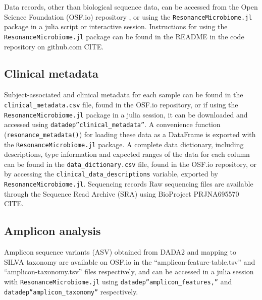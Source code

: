 \documentclass[fleqn,10pt]{wlscirep}
\begin{document}

Data records, other than biological sequence data, can be accessed from the Open Science Foundation (OSF.io) repository \cite{Bonham2021-zy},
or using the \verb|ResonanceMicrobiome.jl| package in a julia script or interactive session.
Instructions for using the \verb|ResonanceMicrobiome.jl| package can be found in the README in the code repository on github.com {{CITE}}.

\subsection*{Clinical metadata}

Subject-associated and clinical metadata for each sample can be found in the \verb|clinical_metadata.csv| file,
found in the OSF.io repository, or if using the \verb|ResonanceMicrobiome.jl| package in a julia session,
it can be downloaded and accessed using \verb|datadep”clinical_metadata”|.
A convenience function (\verb|resonance_metadata()|) for loading these data as a DataFrame
is exported with the \verb|ResonanceMicrobiome.jl| package.
A complete data dictionary, including descriptions, type information and expected ranges of the data for each column
can be found in the \verb|data_dictionary.csv| file, found in the OSF.io repository,
or by accessing the \verb|clinical_data_descriptions| variable, exported by \verb|ResonanceMicrobiome.jl|.
Sequencing records
Raw sequencing files are available through the Sequence Read Archive (SRA) using BioProject PRJNA695570 {{CITE}}.

\subsection*{Amplicon analysis}

Amplicon sequence variants (ASV) obtained from DADA2 and mapping to SILVA taxonomy are available on OSF.io
in the “amplicon-feature-table.tsv” and “amplicon-taxonomy.tsv” files respectively,
and can be accessed in a julia session with \verb|ResonanceMicrobiome.jl| using \verb|datadep”amplicon_features,”|
and \verb|datadep”amplicon_taxonomy”| respectively.
\end{document}
